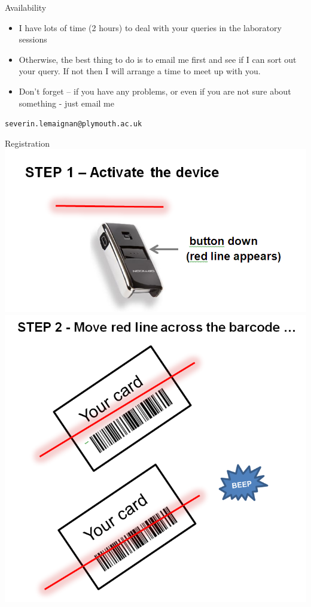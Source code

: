 \documentclass[compress]{beamer}
\begin{document}
\begin{frame}{Availability}

    \begin{itemize}
        \item I have lots of time (2 hours) to deal with your queries in the laboratory sessions
        \item  Otherwise, the best thing to do is to email me first and see if I can sort out your query. If not then I will arrange a time to meet up with you.
        \item Don't forget – if you have any problems, or even if you are not sure about something - just email me

    \end{itemize}

    \begin{center}
        \texttt{severin.lemaignan@plymouth.ac.uk}
    \end{center}
\end{frame}

\begin{frame}{Registration}
        \centering
        \includegraphics[width=0.4\linewidth]{registration1}
        \includegraphics[width=0.4\linewidth]{registration2}
\end{frame}
\end{document}

